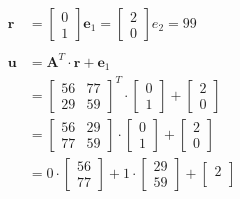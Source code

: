 \begin{align*}
  \textbf{r} & = \begin{bmatrix}0 \\ 1 \end{bmatrix}
  \textbf{e}_1 = \begin{bmatrix}2 \\ 0 \end{bmatrix}
  e_2 = 99                                                                               \\
  \\
  \textbf{u} & = \textbf{A}^T \cdot \textbf{r} + \textbf{e}_1                            \\
             & = \begin{bmatrix}
                   56 & 77  \\
                   29 & 59
                 \end{bmatrix}^T
  \cdot
  \begin{bmatrix}
    0 \\
    1
  \end{bmatrix}
  +
  \begin{bmatrix}
    2 \\
    0
  \end{bmatrix}                                                                        \\
             & = \begin{bmatrix}
                   56 & 29 
                   \\ 77 & 59 
                 \end{bmatrix}
  \cdot 
  \begin{bmatrix}
    0 \\
    1 
  \end{bmatrix}
  +
  \begin{bmatrix}
    2 \\
    0
  \end{bmatrix}                                                                        \\
             & = 0\cdot
  \begin{bmatrix}
    56 \\
    77
  \end{bmatrix}
  + 1 \cdot 
  \begin{bmatrix}
    29 \\
    59
  \end{bmatrix}
  +
  \begin{bmatrix}
    2 \\

\end{bmatrix}
\end{align*}

